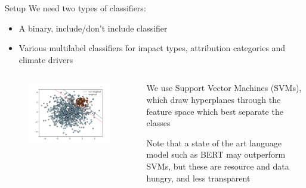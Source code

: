 \documentclass[9pt]{beamer}
\begin{document}
\begin{frame}{Setup}
We need two types of classifiers:
\begin{itemize}
	\item A binary, include/don't include classifier
	\item Various multilabel classifiers for impact types, attribution categories and climate drivers
\end{itemize}

\begin{columns}
	\begin{column}{0.618\linewidth}
		\begin{figure}
			\includegraphics[width=\linewidth]{images/svc_sklearn_unbalanced.png}
		\end{figure}
	\end{column}
	\begin{column}{0.382\linewidth}
		We use Support Vector Machines (SVMs), which draw hyperplanes through the feature space which best separate the classes
		
		\bigskip
		
		Note that a state of the art language model such as BERT may outperform SVMs, but these are resource and data hungry, and less transparent
	\end{column}
\end{columns}

\end{frame}
\end{document}
